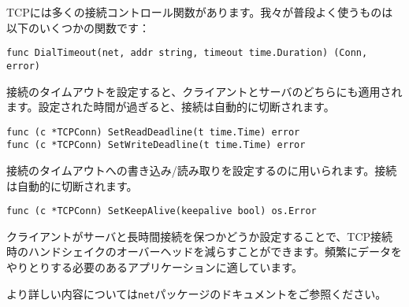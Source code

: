 TCPには多くの接続コントロール関数があります。我々が普段よく使うものは以下のいくつかの関数です：

\begin{lstlisting}[numbers=none]
func DialTimeout(net, addr string, timeout time.Duration) (Conn, error)
\end{lstlisting}

接続のタイムアウトを設定すると、クライアントとサーバのどちらにも適用されます。設定された時間が過ぎると、接続は自動的に切断されます。

\begin{lstlisting}[numbers=none]
func (c *TCPConn) SetReadDeadline(t time.Time) error
func (c *TCPConn) SetWriteDeadline(t time.Time) error
\end{lstlisting}

接続のタイムアウトへの書き込み/読み取りを設定するのに用いられます。接続は自動的に切断されます。

\begin{lstlisting}[numbers=none]
func (c *TCPConn) SetKeepAlive(keepalive bool) os.Error
\end{lstlisting}

クライアントがサーバと長時間接続を保つかどうか設定することで、TCP接続時のハンドシェイクのオーバーヘッドを減らすことができます。頻繁にデータをやりとりする必要のあるアプリケーションに適しています。

より詳しい内容については\texttt{net}パッケージのドキュメントをご参照ください。
